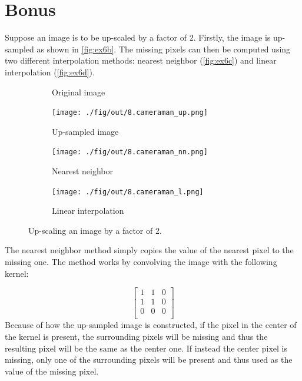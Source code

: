 \documentclass[tikz,14pt,fleqn]{article}
\begin{document}
\section{Bonus}
Suppose an image is to be up-scaled by a factor of 2.
Firstly, the image is up-sampled as shown in \autoref{fig:ex6b}. The missing pixels can then be computed using two different interpolation methods: nearest neighbor (\autoref{fig:ex6c}) and linear interpolation (\autoref{fig:ex6d}).



\begin{figure}[H]
    \vspace*{-1cm}
    \centering
    \begin{subfigure}{0.24\linewidth}
        \centering
        \caption{Original image}
        \label{fig:ex6a}
    \end{subfigure}
    \begin{subfigure}{0.24\linewidth}
        \centering
        \texttt{[image: ./fig/out/8.cameraman\_up.png]}
        \caption{Up-sampled image}
        \label{fig:ex6b}
    \end{subfigure}
    \begin{subfigure}{0.24\linewidth}
        \centering
        \texttt{[image: ./fig/out/8.cameraman\_nn.png]}
        \caption{Nearest neighbor}
        \label{fig:ex6c}
    \end{subfigure}
    \begin{subfigure}{0.24\linewidth}
        \centering
        \texttt{[image: ./fig/out/8.cameraman\_l.png]}
        \caption{Linear interpolation}
        \label{fig:ex6d}
    \end{subfigure}
    \caption{Up-scaling an image by a factor of 2.}
    \label{fig:ex6}
\end{figure}

The nearest neighbor method simply copies the value of the nearest pixel to the missing one. The method works by convolving the image with the following kernel:

$$\begin{bmatrix}
1 & 1 & 0 \\
1 & 1 & 0 \\
0 & 0 & 0 \\
\end{bmatrix}$$
Because of how the up-sampled image is constructed, if the pixel in the center of the kernel is present, the surrounding pixels will be missing and thus the resulting pixel will be the same as the center one. If instead the center pixel is missing, only one of the surrounding pixels will be present and thus used as the value of the missing pixel.
\end{document}
